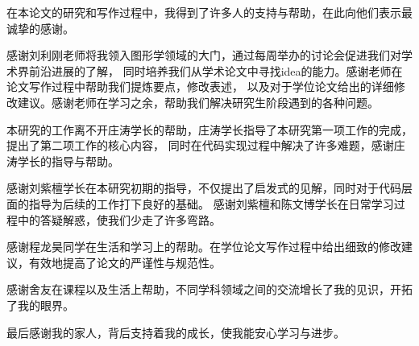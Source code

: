 
\begin{acknowledgements}

在本论文的研究和写作过程中，我得到了许多人的支持与帮助，在此向他们表示最诚挚的感谢。

感谢刘利刚老师将我领入图形学领域的大门，通过每周举办的讨论会促进我们对学术界前沿进展的了解，
同时培养我们从学术论文中寻找idea的能力。感谢老师在论文写作过程中帮助我们提炼要点，修改表述，
以及对于学位论文给出的详细修改建议。感谢老师在学习之余，帮助我们解决研究生阶段遇到的各种问题。

本研究的工作离不开庄涛学长的帮助，庄涛学长指导了本研究第一项工作的完成，提出了第二项工作的核心内容，
同时在代码实现过程中解决了许多难题，感谢庄涛学长的指导与帮助。

感谢刘紫檀学长在本研究初期的指导，不仅提出了启发式的见解，同时对于代码层面的指导为后续的工作打下良好的基础。
感谢刘紫檀和陈文博学长在日常学习过程中的答疑解惑，使我们少走了许多弯路。

感谢程龙昊同学在生活和学习上的帮助。在学位论文写作过程中给出细致的修改建议，有效地提高了论文的严谨性与规范性。

感谢舍友在课程以及生活上帮助，不同学科领域之间的交流增长了我的见识，开拓了我的眼界。

最后感谢我的家人，背后支持着我的成长，使我能安心学习与进步。

\end{acknowledgements}
